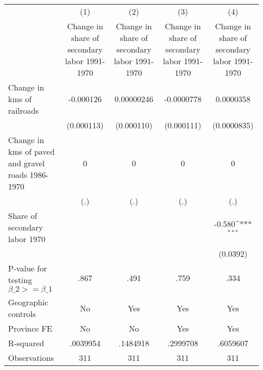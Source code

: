 {
\def\sym#1{\ifmmode^{#1}\else\(^{#1}\)\fi}
\begin{tabular}{l*{4}{c}}
\hline\hline
                &\multicolumn{1}{c}{(1)}&\multicolumn{1}{c}{(2)}&\multicolumn{1}{c}{(3)}&\multicolumn{1}{c}{(4)}\\
                &\multicolumn{1}{c}{Change in share of secondary labor 1991-1970}&\multicolumn{1}{c}{Change in share of secondary labor 1991-1970}&\multicolumn{1}{c}{Change in share of secondary labor 1991-1970}&\multicolumn{1}{c}{Change in share of secondary labor 1991-1970}\\
\hline
Change in kms of railroads&-0.000126         &0.00000246         &-0.0000778         &0.0000358         \\
                &(0.000113)         &(0.000110)         &(0.000111)         &(0.0000835)         \\
[1em]
Change in kms of paved and gravel roads 1986-1970&        0         &        0         &        0         &        0         \\
                &      (.)         &      (.)         &      (.)         &      (.)         \\
[1em]
Share of secondary labor 1970&                  &                  &                  &   -0.580\sym{***}\\
                &                  &                  &                  & (0.0392)         \\
\hline
P-value for testing $\beta\_{2} >= \beta\_{1}$&     .867         &     .491         &     .759         &     .334         \\
Geographic controls&       No         &      Yes         &      Yes         &      Yes         \\
Province FE     &       No         &       No         &      Yes         &      Yes         \\
R-squared       & .0039954         & .1484918         & .2999708         & .6059607         \\
Observations    &      311         &      311         &      311         &      311         \\
\hline\hline
\end{tabular}
}
